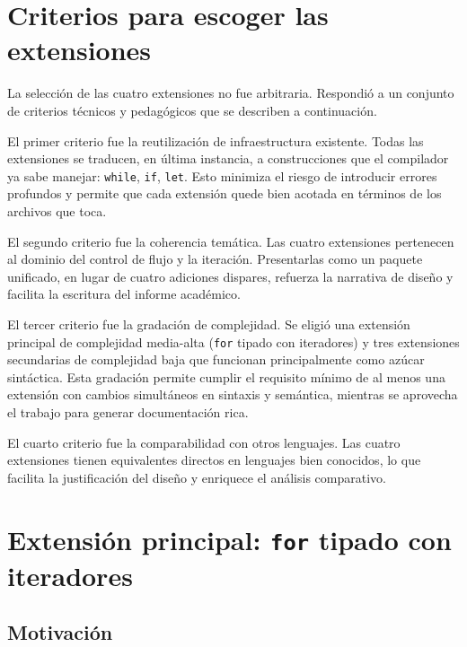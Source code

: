 \documentclass[12pt, a4paper]{article}
\begin{document}
\section{Criterios para escoger las extensiones}

La selección de las cuatro extensiones no fue arbitraria. Respondió a un conjunto de criterios técnicos y pedagógicos que se describen a continuación.

El primer criterio fue la reutilización de infraestructura existente. Todas las extensiones se traducen, en última instancia, a construcciones que el compilador ya sabe manejar: \texttt{while}, \texttt{if}, \texttt{let}. Esto minimiza el riesgo de introducir errores profundos y permite que cada extensión quede bien acotada en términos de los archivos que toca.

El segundo criterio fue la coherencia temática. Las cuatro extensiones pertenecen al dominio del control de flujo y la iteración. Presentarlas como un paquete unificado, en lugar de cuatro adiciones dispares, refuerza la narrativa de diseño y facilita la escritura del informe académico.

El tercer criterio fue la gradación de complejidad. Se eligió una extensión principal de complejidad media-alta (\texttt{for} tipado con iteradores) y tres extensiones secundarias de complejidad baja que funcionan principalmente como azúcar sintáctica. Esta gradación permite cumplir el requisito mínimo de al menos una extensión con cambios simultáneos en sintaxis y semántica, mientras se aprovecha el trabajo para generar documentación rica.

El cuarto criterio fue la comparabilidad con otros lenguajes. Las cuatro extensiones tienen equivalentes directos en lenguajes bien conocidos, lo que facilita la justificación del diseño y enriquece el análisis comparativo.

\section{Extensión principal: \texttt{for} tipado con iteradores}

\subsection{Motivación}
\end{document}
